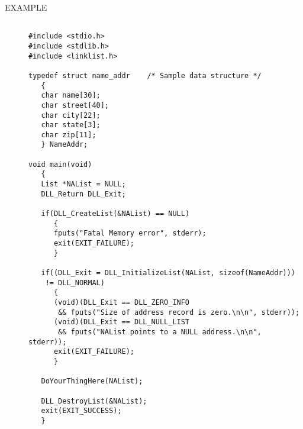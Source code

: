 \documentclass[10pt,letterpaper]{report}
\begin{document}
\begin{description}
\item[EXAMPLE]
\small
\begin{verbatim}

#include <stdio.h>
#include <stdlib.h>
#include <linklist.h>

typedef struct name_addr    /* Sample data structure */
   {
   char name[30];
   char street[40];
   char city[22];
   char state[3];
   char zip[11];
   } NameAddr;

void main(void)
   {
   List *NAList = NULL;
   DLL_Return DLL_Exit;

   if(DLL_CreateList(&NAList) == NULL)
      {
      fputs("Fatal Memory error", stderr);
      exit(EXIT_FAILURE);
      }

   if((DLL_Exit = DLL_InitializeList(NAList, sizeof(NameAddr)))
    != DLL_NORMAL)
      {
      (void)(DLL_Exit == DLL_ZERO_INFO
       && fputs("Size of address record is zero.\n\n", stderr));
      (void)(DLL_Exit == DLL_NULL_LIST
       && fputs("NAList points to a NULL address.\n\n", stderr));
      exit(EXIT_FAILURE);
      }

   DoYourThingHere(NAList);

   DLL_DestroyList(&NAList);
   exit(EXIT_SUCCESS);
   }
\end{verbatim}
\normalsize
\end{description}

\pagebreak
\end{document}
